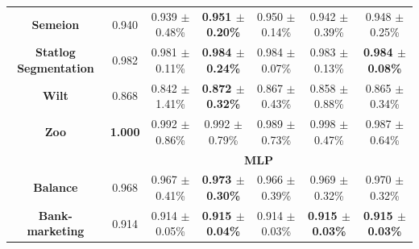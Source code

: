 \documentclass[preprint,12pt]{elsarticle}
\begin{document}
\begin{table}
{\begin{tabular}{ccccccc}
\textbf{Semeion}                & 0.940                                 & 0.939 $\pm$ 0.48\%                                 & {\color[HTML]{FE0000} \textbf{0.951 $\pm$ 0.20\%}} & 0.950 $\pm$ 0.14\%                                 & 0.942 $\pm$ 0.39\%                                 & 0.948 $\pm$ 0.25\%                                 \\
\textbf{Statlog   Segmentation} & 0.982                                 & 0.981 $\pm$ 0.11\%                                 & \textbf{0.984 $\pm$ 0.24\%}                        & 0.984 $\pm$ 0.07\%                                 & 0.983 $\pm$ 0.13\%                                 & {\color[HTML]{FE0000} \textbf{0.984 $\pm$ 0.08\%}} \\
\textbf{Wilt}                   & 0.868                                 & 0.842 $\pm$ 1.41\%                                 & {\color[HTML]{FE0000} \textbf{0.872 $\pm$ 0.32\%}} & 0.867 $\pm$ 0.43\%                                 & 0.858 $\pm$ 0.88\%                                 & 0.865 $\pm$ 0.34\%                                 \\
\textbf{Zoo}                    & {\color[HTML]{FE0000} \textbf{1.000}} & 0.992 $\pm$ 0.86\%                                 & 0.992 $\pm$ 0.79\%                                 & 0.989 $\pm$ 0.73\%                                 & 0.998 $\pm$ 0.47\%                                 & 0.987 $\pm$ 0.64\%                                 \\ \hline
\textbf{}                       & \multicolumn{6}{c}{\textbf{MLP}}                                                                                                                                                                                                                                                           \\ \hline
\textbf{Balance}                & 0.968                                 & 0.967 $\pm$ 0.41\%                                 & {\color[HTML]{FE0000} \textbf{0.973 $\pm$ 0.30\%}} & 0.966 $\pm$ 0.39\%                                 & 0.969 $\pm$ 0.32\%                                 & 0.970 $\pm$ 0.32\%                                 \\
\textbf{Bank-marketing}         & 0.914                                 & 0.914 $\pm$ 0.05\%                                 & \textbf{0.915 $\pm$ 0.04\%}                        & 0.914 $\pm$ 0.03\%                                 & {\color[HTML]{FE0000} \textbf{0.915 $\pm$ 0.03\%}} & {\color[HTML]{FE0000} \textbf{0.915 $\pm$ 0.03\%}} \\

\end{tabular}}
\end{table}
\end{document}
